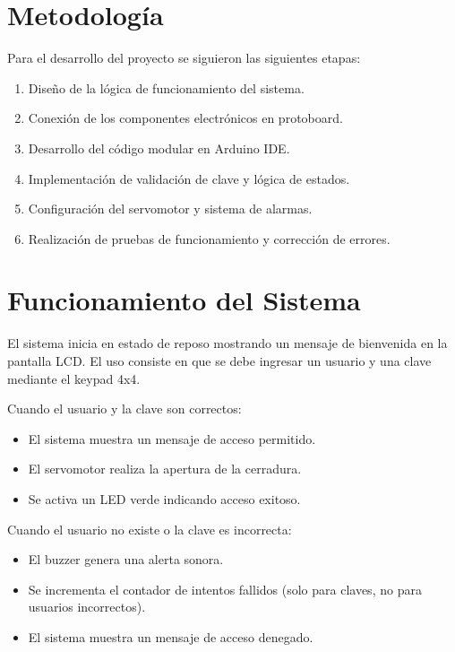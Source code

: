 \documentclass[conference]{IEEEtran}
\begin{document}
\section{Metodología}

Para el desarrollo del proyecto se siguieron las siguientes etapas:

\begin{enumerate}
    \item Diseño de la lógica de funcionamiento del sistema.
    \item Conexión de los componentes electrónicos en protoboard.
    \item Desarrollo del código modular en Arduino IDE.
    \item Implementación de validación de clave y lógica de estados.
    \item Configuración del servomotor y sistema de alarmas.
    \item Realización de pruebas de funcionamiento y corrección de errores.
\end{enumerate}

\section{Funcionamiento del Sistema}

El sistema inicia en estado de reposo mostrando un mensaje de bienvenida en la pantalla LCD. El uso consiste 
en que se debe ingresar un usuario y una clave mediante el keypad 4x4.

Cuando el usuario y la clave son correctos:

\begin{itemize}
    \item El sistema muestra un mensaje de acceso permitido.
    \item El servomotor realiza la apertura de la cerradura.
    \item Se activa un LED verde indicando acceso exitoso.
\end{itemize}

Cuando el usuario no existe o la clave es incorrecta:

\begin{itemize}
    \item El buzzer genera una alerta sonora.
    \item Se incrementa el contador de intentos fallidos (solo para claves, no para usuarios incorrectos).
    \item El sistema muestra un mensaje de acceso denegado.
\end{itemize}
\end{document}
